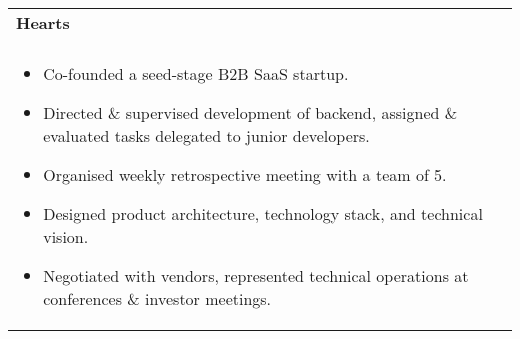 \documentclass[letterpaper,10pt]{article} %
\begin{document}
\begin{tabular*}{\linewidth}{@{\extracolsep{\fill}} lr }

\textbf{Hearts} & \scriptsize\bfseries\color{sectioncolour}{Cincinnati, OH}\\
\footnotesize\bfseries\color{sectioncolour}{CTO} & \scriptsize\bfseries\color{sectioncolour}{August 2024 - Present}\\
\multicolumn{2}{p{\linewidth}}{
    \scriptsize{\vspace{-0.1in}\begin{itemize}[nosep]
        \item Co-founded a seed-stage B2B SaaS startup.
        \item Directed \& supervised development of backend, assigned \& evaluated tasks delegated to junior developers.
        \item Organised weekly retrospective meeting with a team of 5.
        \item Designed product architecture, technology stack, and technical vision.
        \item Negotiated with vendors, represented technical operations at conferences \& investor meetings.
    \end{itemize}\vspace{-0.1in}}
}\\


\end{tabular*}
\end{document}
